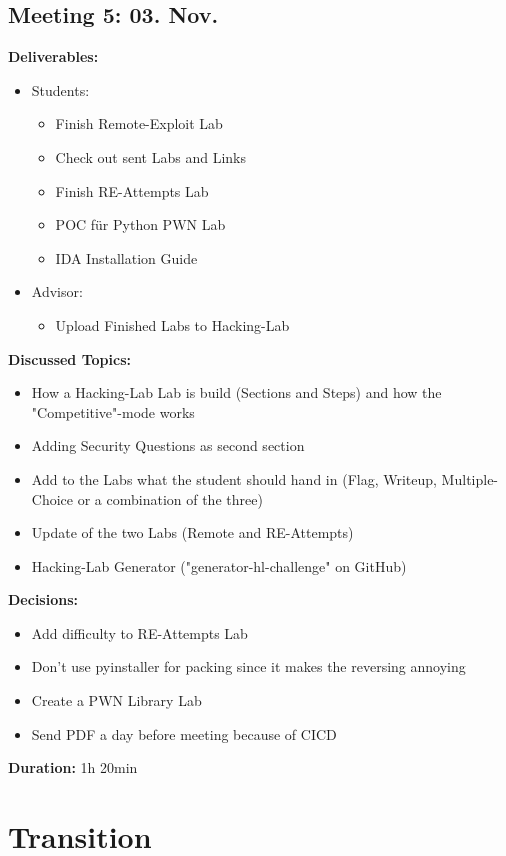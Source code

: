 \subsection*{Meeting 5: 03. Nov.}
\textbf{Deliverables:}
\begin{itemize}
    \item Students:
    \begin{itemize}
        \item Finish Remote-Exploit Lab
        \item Check out sent Labs and Links
        \item Finish RE-Attempts Lab
        \item POC für Python PWN Lab
        \item IDA Installation Guide
    \end{itemize}
    \item Advisor:
    \begin{itemize}
        \item Upload Finished Labs to Hacking-Lab
    \end{itemize}
\end{itemize} 
\textbf{Discussed Topics:}
\begin{itemize}
    \item How a Hacking-Lab Lab is build (Sections and Steps) and how the "Compe\-titive"-mode works
    \item Adding Security Questions as second section
    \item Add to the Labs what the student should hand in (Flag, Writeup, Multiple-Choice or a combination of the three)
    \item Update of the two Labs (Remote and RE-Attempts)
    \item Hacking-Lab Generator ("generator-hl-challenge" on GitHub)
\end{itemize}
\textbf{Decisions:}
\begin{itemize}
    \item Add difficulty to RE-Attempts Lab
    \item Don't use pyinstaller for packing since it makes the reversing annoying
    \item Create a PWN Library Lab
    \item Send PDF a day before meeting because of CICD
\end{itemize}
\textbf{Duration:} 1h 20min

\section{Transition}
